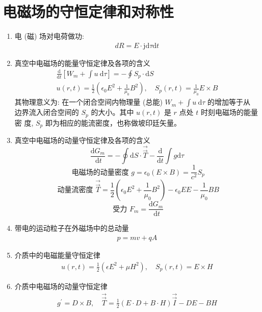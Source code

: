 \documentclass[../../note.tex]{subfiles}
\begin{document}
\section{电磁场的守恒定律和对称性}
\begin{enumerate}
	\item 电 (磁) 场对电荷做功:
		\begin{align}
	d R={E} \cdot \mathrm{j} \mathrm{d} \tau \mathrm{d} t
\end{align}
	\item 真空中电磁场的能量守恒定律及各项的含义
	\begin{align}
		\frac{\mathrm{d}}{\mathrm{d} t}\left[W_m+\int u \mathrm{~d} \tau\right]=-\oint S_p \cdot \mathrm{d} {S} \\
		u(r, t)=\frac{1}{2}\left(\epsilon_0 E^2+\frac{1}{\mu_0} B^2\right), \quad S_p(r, t)=\frac{1}{\mu_0} {E} \times {B}
	\end{align}
	其物理意义为: 在一个闭合空间内物理量 (总能) $W_m+\int u \mathrm{~d} \tau$ 的增加等于从 边界流入闭合空间的 $S_p$ 的大小。其中 $u(r, t)$ 是 $r$ 点处 $t$ 时刻电磁场的能量密 度, $S_p$ 即为相应的能流密度，也称做坡印廷矢量。
	\item 真空中电磁场的动量守恒定律及各项的含义
\begin{equation}
	\frac{\mathrm{d} {G}_m}{\mathrm{~d} t}=-\oint \mathrm{d} {S} \cdot \overrightarrow{\vec{T}}-\frac{\mathrm{d}}{\mathrm{d} t} \int {g} \mathrm{d} \tau
\end{equation}
\begin{equation}
	\text { 电磁场的动量密度 } g=\epsilon_0(E \times B)=\frac{1}{c^2} S_p
\end{equation}
\begin{equation}
	\text { 动量流密度 } \overrightarrow{\vec{T}}=\frac{1}{2}\left(\epsilon_0 E^2+\frac{1}{\mu_0} B^2\right)-\epsilon_0 {E} {E}-\frac{1}{\mu_0} {B} {B}
\end{equation}
\begin{equation}
	\text { 受力 } {F}_m=\frac{\mathrm{d} {G}_m}{\mathrm{~d} t}
\end{equation}
	\item 带电的运动粒子在外磁场中的总动量
	\begin{align}
	p=m {v}+q {A}
\end{align}
	\item 介质中的电磁能量守恒定律
\begin{align}
	u(r, t)=\frac{1}{2}\left(\epsilon E^2+\mu H^2\right), \quad {S}_p({r}, t)={E} \times {H}
\end{align}
	\item 介质中电磁场的动量守恒定律
\begin{align}
	g^{\prime}=D \times B, \quad \overrightarrow{\overrightarrow{T}}=\frac{1}{2}(E \cdot D+B \cdot H) \overrightarrow{\overrightarrow{I}}-D E-B H
\end{align}
	
\end{enumerate}
\end{document}
